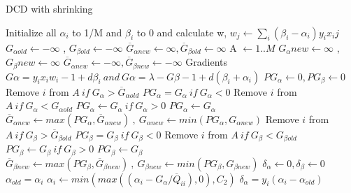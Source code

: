 \begin{algorithm}
\caption{DCD with shrinking}\label{array-sum}
\begin{algorithmic}[1]
	\State Initialize all $\alpha_i$ to 1/M and $\beta_i$ to 0 and calculate w, $w_j \gets \sum_i{(\beta_i-\alpha_i)y_ix_ij}$
	\State $G_{\alpha old} \gets -\infty$ , $G_{\beta old} \gets -\infty$ 
	\State $\overline{G}_{\alpha new} \gets \infty , \overline{G}_{\beta old} \gets \infty$
	\State A $\gets {1..M}$
    	\State $G{_\alpha new} \gets \infty$ , $G{_\beta new} \gets \infty$ 
	    \State $\overline{G}_{\alpha new} \gets -\infty , \overline{G}_{\beta new} \gets -\infty$
		    \State Gradients $G\alpha = y_ix_iw_i - 1 + d\beta_i \:and\:G\alpha = \lambda - G\beta - 1 + d(\beta_i+\alpha_i)$
		    \State $PG_\alpha \gets 0, PG_\beta \gets 0$
		    \State Remove $i$ from $A\: if\: G_\alpha > \overline{G}_{\alpha old}$
		    \State $PG_\alpha = G_\alpha\:if\: G_\alpha < 0$
		    \State Remove $i$ from $A\: if\: G_\alpha < G_{\alpha old}$
		    \State $PG_\alpha \gets G_\alpha\:if\: G_\alpha > 0$
		    \Else
		    \State $PG_\alpha \gets G_\alpha$
		    \EndIf
		    \State $\overline{G}_{\alpha new}\gets max(PG_\alpha,\overline{G}_{\alpha new})\:,\: 
                G_{\alpha new}\gets min(PG_\alpha,G_{\alpha new})$
		    \State Remove $i$ from $A\: if\: G_\beta > \overline{G}_{\beta old}$
		    \State $PG_\beta = G_\beta\:if\: G_\beta < 0$
		    \State Remove $i$ from $A\: if\: G_\beta < G_{\beta old}$
		    \State $PG_\beta \gets G_\beta\:if\: G_\beta > 0$
		    \Else
		    \State $PG_\beta \gets G_\beta$
		    \EndIf
		    \State $\overline{G}_{\beta new}\gets max(PG_\beta,\overline{G}_{\beta new})\:,\: 
                G_{\beta new}\gets min(PG_\beta,G_{\beta new})$
            \State $\delta_\alpha \gets 0 , \delta_\beta \gets 0$
                \State $\alpha_{old} = \alpha_i$
                \State $\alpha_i \gets min(max((\alpha_i - G_\alpha/\overline{Q}_{ii}),0),C_2)$
                \State $\delta_\alpha = y_i(\alpha_i - \alpha_{old})$
            \EndIf
        \end{algorithmic}
\end{algorithm}
